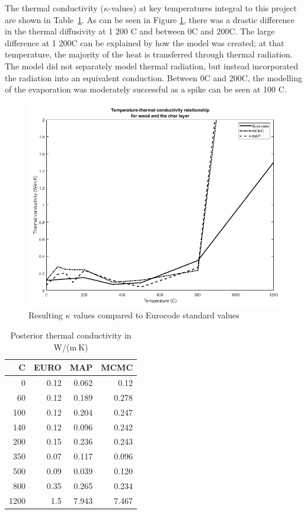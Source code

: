 The thermal conductivity ($\kappa$-values) at key temperatures integral to this project are shown in Table~\ref{krestab}. 
As can be seen in Figure \ref{kresult_euro_fig}, there was a drastic difference in the thermal diffusivity at 1 200 \textdegree C and between 0\textdegree C and 200\textdegree C.
The large difference at 1 200\textdegree C can be explained by how the model was created; at that temperature, the majority of the heat is transferred through thermal radiation.
The model did not separately model thermal radiation, but instead incorporated the radiation into an equivalent conduction.
Between 0\textdegree C and 200\textdegree C, the modelling of the evaporation was moderately successful as a spike can be seen at 100 \textdegree C.  
\begin{figure}
\centering	
	\includegraphics[width=\textwidth]{figures/kvalues_all_NOshi.png}
	\caption{Resulting $\kappa$ values compared to Eurocode standard values}
	\label{kresult_euro_fig}
\end{figure}
\begin{table} 
\centering
\caption{Posterior thermal conductivity in W/(m$\ $K)}
\label{krestab}
	\begin{tabular}{ r r r r }
	\toprule
	 \textdegree C & EURO & MAP & MCMC\\
	\midrule
	0   & 0.12&0.062 &0.12\\
	60  &0.12& 0.189 &0.278\\
	100 &0.12& 0.204 &0.247\\
 	140 &0.12& 0.096 &0.242\\
	200 & 0.15& 0.236 &0.243\\
	350 & 0.07& 0.117  &0.096\\
	500 & 0.09& 0.039 &0.120\\
	800 & 0.35& 0.265 &0.234\\
	1200& 1.5& 7.943 &7.467\\
	\bottomrule	
	\end{tabular}
	
\end{table}
 
